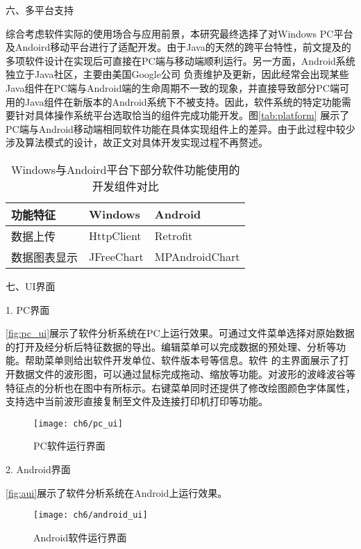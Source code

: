 六、多平台支持

综合考虑软件实际的使用场合与应用前景，本研究最终选择了对Windows PC平台及Andoird移动平台进行了适配开发。由于Java的天然的跨平台特性，前文提及的多项软件设计在实现后可直接在PC端与移动端顺利运行。另一方面，Android系统独立于Java社区，主要由美国Google公司
负责维护及更新，因此经常会出现某些Java组件在PC端与Android端的生命周期不一致的现象，并直接导致部分PC端可用的Java组件在新版本的Android系统下不被支持。因此，软件系统的特定功能需要针对具体操作系统平台选取恰当的组件完成功能开发。图\autoref{tab:platform}
展示了PC端与Android移动端相同软件功能在具体实现组件上的差异。由于此过程中较少涉及算法模式的设计，故正文对具体开发实现过程不再赘述。
\begin{table}[htbp]
    \centering
    \fontsize{10}{6}
    \caption{\label{tab:platform}Windows与Andoird平台下部分软件功能使用的开发组件对比}
    \begin{tabularx}{\linewidth}{X<{\centering}X<{\centering}X<{\centering}}
        \toprule \textbf{功能特征}&\textbf{Windows}&\textbf{Android}\\
        \midrule 
        数据上传&HttpClient\cite{HttpClient}&Retrofit\cite{Retrofit}\\
        数据图表显示&JFreeChart\cite{JFreeChart}&MPAndroidChart\cite{MPAndroidChart}\\
        \bottomrule
    \end{tabularx}
\end{table}

七、UI界面

1. PC界面

\autoref{fig:pc_ui}展示了软件分析系统在PC上运行效果。可通过文件菜单选择对原始数据的打开及经分析后特征数据的导出。编辑菜单可以完成数据的预处理、分析等功能。帮助菜单则给出软件开发单位、软件版本号等信息。软件
的主界面展示了打开数据文件的波形图，可以通过鼠标完成拖动、缩放等功能。对波形的波峰波谷等特征点的分析也在图中有所标示。右键菜单同时还提供了修改绘图颜色字体属性，支持选中当前波形直接复制至文件及连接打印机打印等功能。
\begin{figure}[htbp]
    \centering
    \texttt{[image: ch6/pc\_ui]}
    \caption{\label{fig:pc_ui}PC软件运行界面}
\end{figure}

2. Android界面

\autoref{fig:aui}展示了软件分析系统在Android上运行效果。
\begin{figure}[htbp]
    \centering
    \texttt{[image: ch6/android\_ui]}
    \caption{\label{fig:aui}Android软件运行界面}
\end{figure}

